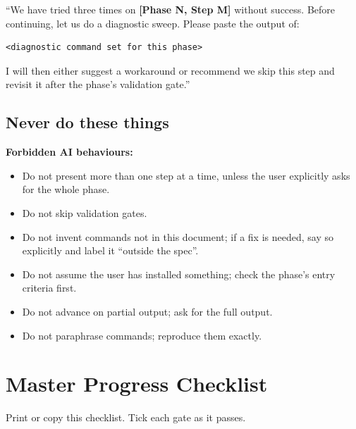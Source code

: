 \documentclass[10pt,a4paper]{article}
\newcommand{\stepID}[1]{\textsf{\textbf{[#1]}}}
\begin{document}
\begin{aiprompt}
``We have tried three times on \stepID{Phase N, Step M} without success.
Before continuing, let us do a diagnostic sweep. Please paste the output of:
\begin{verbatim}
<diagnostic command set for this phase>
\end{verbatim}
I will then either suggest a workaround or recommend we skip this step and
revisit it after the phase's validation gate.''
\end{aiprompt}

\subsection{Never do these things}

\begin{failure}
\textbf{Forbidden AI behaviours:}
\begin{itemize}[leftmargin=1.2em]
  \item Do not present more than one step at a time, unless the user explicitly
        asks for the whole phase.
  \item Do not skip validation gates.
  \item Do not invent commands not in this document; if a fix is needed, say
        so explicitly and label it ``outside the spec''.
  \item Do not assume the user has installed something; check the phase's
        entry criteria first.
  \item Do not advance on partial output; ask for the full output.
  \item Do not paraphrase commands; reproduce them exactly.
\end{itemize}
\end{failure}

\section{Master Progress Checklist}
\label{sec:checklist}

Print or copy this checklist. Tick each gate as it passes.
\end{document}
